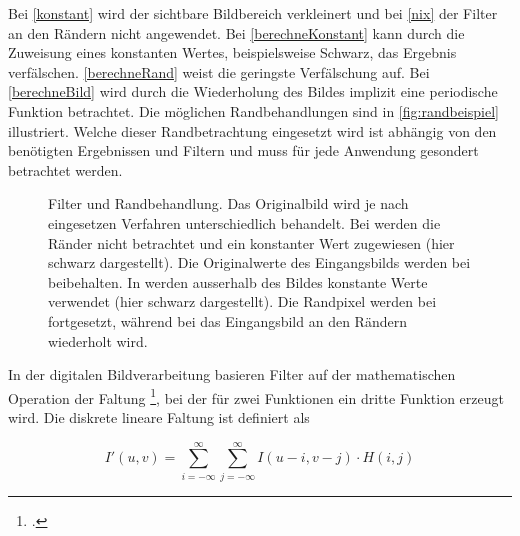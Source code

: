 Bei \autoref{konstant} wird der sichtbare Bildbereich verkleinert und bei \autoref{nix} der Filter an den Rändern nicht
 angewendet. Bei \autoref{berechneKonstant} kann durch die Zuweisung eines konstanten Wertes, beispielsweise Schwarz,
 das Ergebnis verfälschen. \autoref{berechneRand} weist die geringste Verfälschung auf. Bei \autoref{berechneBild} wird
 durch die Wiederholung des Bildes implizit eine periodische Funktion betrachtet. Die möglichen Randbehandlungen sind
 in \autoref{fig:randbeispiel} illustriert. Welche dieser Randbetrachtung eingesetzt wird ist abhängig von den
 benötigten Ergebnissen und Filtern und muss für jede Anwendung gesondert betrachtet werden.

\begin{figure}[!ht]
	\centering
	\caption{Filter und Randbehandlung. Das Originalbild  wird je nach eingesetzen
	 Verfahren unterschiedlich behandelt. Bei  werden die Ränder nicht betrachtet und ein
	 konstanter Wert zugewiesen (hier schwarz dargestellt).	Die Originalwerte des Eingangsbilds werden bei
	  beibehalten. In  werden ausserhalb des Bildes konstante
	 Werte verwendet (hier schwarz dargestellt). Die Randpixel werden bei  fortgesetzt,
	 während bei  das Eingangsbild an den Rändern wiederholt wird.}
	\label{fig:randbeispiel}
\end{figure}

In der digitalen Bildverarbeitung basieren Filter auf der mathematischen Operation der Faltung
\footcite[Vgl.][S.~101--104]{burger05}, bei der für zwei Funktionen ein dritte Funktion erzeugt wird. Die diskrete
 lineare Faltung ist definiert als

\begin{equation}
	I'\left(u,v\right) =
	\sum \limits_{i = -\infty}^{\infty}
	\sum \limits_{j = -\infty}^{\infty}
	I\left(u - i, v - j\right) \cdot H\left(i,j\right)
\end{equation}

